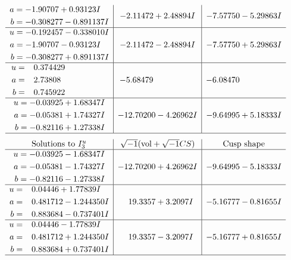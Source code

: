 \documentclass[1p]{elsarticle_modified}
\theoremstyle{definition}
\newcommand{\I}{\sqrt{-1}}
\begin{document}
$$\begin{array}{c|c|c}
\begin{aligned}
a &= -1.90707 + 0.93123 I \\
b &= -0.308277 - 0.891137 I\end{aligned}
 & -2.11472 + 2.48894 I & -7.57750 - 5.29863 I \\ \hline\begin{aligned}
u &= -0.192457 - 0.338010 I \\
a &= -1.90707 - 0.93123 I \\
b &= -0.308277 + 0.891137 I\end{aligned}
 & -2.11472 - 2.48894 I & -7.57750 + 5.29863 I \\ \hline\begin{aligned}
u &= \phantom{-}0.374429\phantom{ +0.000000I} \\
a &= \phantom{-}2.73808\phantom{ +0.000000I} \\
b &= \phantom{-}0.745922\phantom{ +0.000000I}\end{aligned}
 & -5.68479\phantom{ +0.000000I} & -6.08470\phantom{ +0.000000I} \\ \hline\begin{aligned}
u &= -0.03925 + 1.68347 I \\
a &= -0.05381 + 1.74327 I \\
b &= -0.82116 + 1.27338 I\end{aligned}
 & -12.70200 - 4.26962 I & -9.64995 + 5.18333 I\\
 \hline 
 \end{array}$$\newpage$$\begin{array}{c|c|c}  
\text{Solutions to }I^u_{3}& \I (\text{vol} + \sqrt{-1}CS) & \text{Cusp shape}\\
 \hline 
\begin{aligned}
u &= -0.03925 - 1.68347 I \\
a &= -0.05381 - 1.74327 I \\
b &= -0.82116 - 1.27338 I\end{aligned}
 & -12.70200 + 4.26962 I & -9.64995 - 5.18333 I \\ \hline\begin{aligned}
u &= \phantom{-}0.04446 + 1.77839 I \\
a &= \phantom{-}0.481712 - 1.244350 I \\
b &= \phantom{-}0.883684 - 0.737401 I\end{aligned}
 & \phantom{-}19.3357 + 3.2097 I & -5.16777 - 0.81655 I \\ \hline\begin{aligned}
u &= \phantom{-}0.04446 - 1.77839 I \\
a &= \phantom{-}0.481712 + 1.244350 I \\
b &= \phantom{-}0.883684 + 0.737401 I\end{aligned}
 & \phantom{-}19.3357 - 3.2097 I & -5.16777 + 0.81655 I\\
 \hline 
 \end{array}$$\newpage
\end{document}
